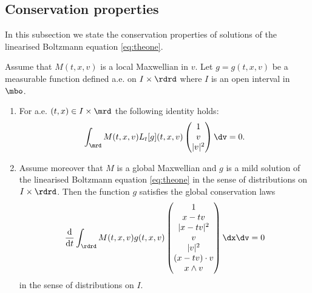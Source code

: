 \subsection{Conservation properties} %
\label{sub:conservation_properties}
In this subsection we state the conservation properties of solutions of the linearised Boltzmann equation \eqref{eq:theone}.
\begin{theorem}
	\label{th:conserv}
	Assume that $M(t,x,v)$ is a local Maxwellian in $v$. Let $g=g(t,x,v)$ be a measurable function defined a.e. on $I\times\rdrd$ where $I$ is an open interval in $\mbo$.
	
	\begin{enumerate}
		\item  For a.e. $(t,x)\in I\times \mrd$ the following identity holds:
		\[\int_{\mrd} M(t,x,v) L_t[g](t,x,v)\begin{pmatrix}
			1\\v\\|v|^2
		\end{pmatrix}\dv=0.\]
		\item Assume moreover that $M$ is a global Maxwellian and $g$ is a mild solution of the linearised Boltzmann equation \eqref{eq:theone} in the sense of distributions on $I\times\rdrd$. Then
		the function $g$ satisfies the global conservation laws
		\[\frac{\mathrm d}{\mathrm dt}\int_{\rdrd} M(t,x,v)g(t,x,v)\begin{pmatrix}
			1\\
			x-tv\\
			|x-tv|^2\\
			v\\
			|v|^2\\
			(x-tv)\cdot v\\
			x\wedge v
		\end{pmatrix}\dx\dv=0\]
		in the sense of distributions on $I$.
	\end{enumerate}
\end{theorem}

